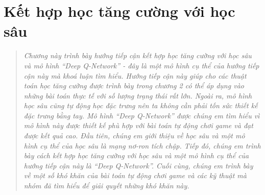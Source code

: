 %

\chapter{Kết hợp học tăng cường với học sâu}
\ifpdf
\graphicspath{{Chapter3/Chapter3Figs/PNG/}{Chapter3/Chapter3Figs/PDF/}{Chapter3/Chapter3Figs/}}
\else
\graphicspath{{Chapter3/Chapter3Figs/EPS/}{Chapter3/Chapter3Figs/}}
\fi
\begin{quote}
\textit{Chương này trình bày hướng tiếp cận kết hợp học tăng cường với học sâu và mô hình ``Deep Q-Network'' \cite{mnihdqn2015} - đây là một mô hình cụ thể của hướng tiếp cận này mà khoá luận tìm hiểu.
Hướng tiếp cận này giúp cho các thuật toán học tăng cường được trình bày trong chương 2 có thể áp dụng vào những bài toán thực tế với số lượng trạng thái rất lớn.
Ngoài ra, mô hình học sâu cũng tự động học đặc trưng nên ta không cần phải tốn sức thiết kế đặc trưng bằng tay.
Mô hình ``Deep Q-Network'' được chúng em tìm hiểu vì mô hình này được thiết kế phù hợp với bài toán tự động chơi game và đạt được kết quả cao.
Đầu tiên, chúng em giới thiệu về học sâu và một mô hình cụ thể của học sâu là mạng nơ-ron tích chập.
Tiếp đó, chúng em trình bày cách kết hợp học tăng cường với học sâu và một mô hình cụ thể của hướng tiếp cận này là ``Deep Q-Network''.
Cuối cùng, chúng em trình bày về một số khó khăn của bài toán tự động chơi game và các kỹ thuật mà nhóm đã tìm hiểu để giải quyết những khó khăn này.}
\end{quote}

